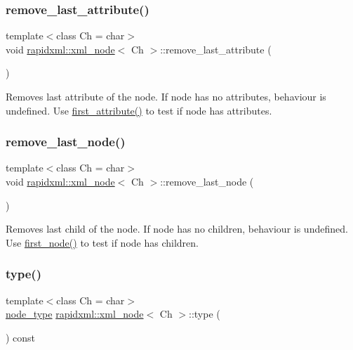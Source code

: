 \subsubsection{\texorpdfstring{remove\+\_\+last\+\_\+attribute()}{remove\_last\_attribute()}}
{\footnotesize\ttfamily template$<$class Ch = char$>$ \\
void \mbox{\hyperlink{classrapidxml_1_1xml__node}{rapidxml\+::xml\+\_\+node}}$<$ Ch $>$\+::remove\+\_\+last\+\_\+attribute (\begin{DoxyParamCaption}{ }\end{DoxyParamCaption})\hspace{0.3cm}{\ttfamily [inline]}}

Removes last attribute of the node. If node has no attributes, behaviour is undefined. Use \mbox{\hyperlink{classrapidxml_1_1xml__node_ab816ab6f13ee4b0588d5b76b0697511c}{first\+\_\+attribute()}} to test if node has attributes. \mbox{\label{classrapidxml_1_1xml__node_a9182512e948ec451a83f116cce7c7674}} 
\subsubsection{\texorpdfstring{remove\+\_\+last\+\_\+node()}{remove\_last\_node()}}
{\footnotesize\ttfamily template$<$class Ch = char$>$ \\
void \mbox{\hyperlink{classrapidxml_1_1xml__node}{rapidxml\+::xml\+\_\+node}}$<$ Ch $>$\+::remove\+\_\+last\+\_\+node (\begin{DoxyParamCaption}{ }\end{DoxyParamCaption})\hspace{0.3cm}{\ttfamily [inline]}}

Removes last child of the node. If node has no children, behaviour is undefined. Use \mbox{\hyperlink{classrapidxml_1_1xml__node_acdf3691224d683f50692616a92a75d3f}{first\+\_\+node()}} to test if node has children. \mbox{\label{classrapidxml_1_1xml__node_a5f91729128856b0aaab598d4364ace60}} 
\subsubsection{\texorpdfstring{type()}{type()}\hspace{0.1cm}{\footnotesize\ttfamily [1/2]}}
{\footnotesize\ttfamily template$<$class Ch = char$>$ \\
\mbox{\hyperlink{rapidxml_8hpp_abb456db38f7efb746c4330eed6072a7c}{node\+\_\+type}} \mbox{\hyperlink{classrapidxml_1_1xml__node}{rapidxml\+::xml\+\_\+node}}$<$ Ch $>$\+::type (\begin{DoxyParamCaption}{ }\end{DoxyParamCaption}) const\hspace{0.3cm}{\ttfamily [inline]}}

